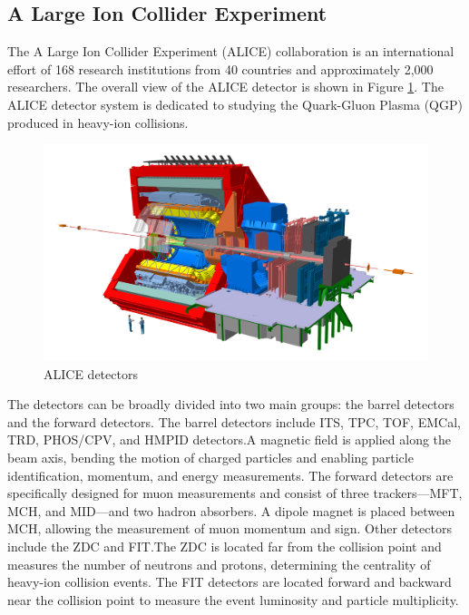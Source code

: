         \subsection{A Large Ion Collider Experiment}
        The A Large Ion Collider Experiment (ALICE) collaboration is an international effort of 168 research institutions from 40 countries and approximately 2,000 researchers. The overall view of the ALICE detector is shown in Figure \ref{ALICE_detectors}. The ALICE detector system is dedicated to studying the Quark-Gluon Plasma (QGP) produced in heavy-ion collisions.
        \begin{figure}[htbp]
            \centering
            \includegraphics[keepaspectratio, scale=0.2]{fig/2_1_ALICE_RUN3_detectors.jpg}
            \caption{ALICE detectors}
            \label{ALICE_detectors}
        \end{figure}
        The detectors can be broadly divided into two main groups: the barrel detectors and the forward detectors.
        The barrel detectors include ITS, TPC, TOF, EMCal, TRD, PHOS/CPV, and HMPID detectors.\@ A magnetic field is applied along the beam axis, bending the motion of charged particles and enabling particle identification, momentum, and energy measurements. The forward detectors are specifically designed for muon measurements and consist of three trackers—MFT, MCH, and MID—and two hadron absorbers. A dipole magnet is placed between MCH, allowing the measurement of muon momentum and sign. Other detectors include the ZDC and FIT.\@ The ZDC is located far from the collision point and measures the number of neutrons and protons, determining the centrality of heavy-ion collision events. The FIT detectors are located forward and backward near the collision point to measure the event luminosity and particle multiplicity.
